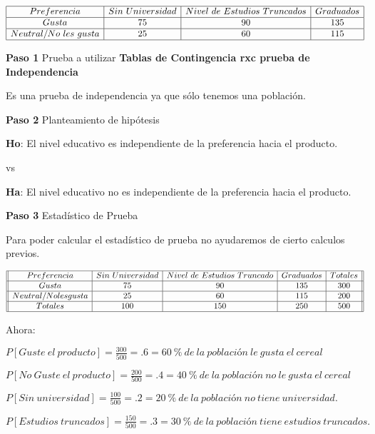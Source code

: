\documentclass[a4paper,oneside,openany]{book}
\begin{document}
\[
\begin{equation*}
\begin{array}{|c|c|c|c|} 
\hline
Preferencia& Sin\ Universidad&Nivel\ de\ Estudios\ Truncados&Graduados\\
\hline
Gusta& 75&90&135\\
\hline
Neutral/No\ les\ gusta& 25&60&115\\
\hline
\end {array}
\end{equation*}
\]

\textbf{Paso 1} Prueba a utilizar \textbf{Tablas de Contingencia rxc
prueba de Independencia}

Es una prueba de independencia ya que sólo tenemos una población.

\textbf{Paso 2} Planteamiento de hipótesis

\textbf{Ho}: El nivel educativo es independiente de la preferencia hacia
el producto.

vs

\textbf{Ha}: El nivel educativo no es independiente de la preferencia
hacia el producto.

\textbf{Paso 3} Estadístico de Prueba

Para poder calcular el estadístico de prueba no ayudaremos de cierto
calculos previos.

\[
\begin{equation*}
\begin{array}{||c| c| c |c |c||} 
\hline 
Preferencia&Sin\ Universidad& Nivel\ de\ Estudios\ Truncado&Graduados & Totales \\  
 \hline
Gusta&75&90&135&300\\
 \hline
Neutral/No les gusta&25&60&115&200\\
 \hline
Totales&100&150&250&500\\
 \hline
\end{array}
\end{equation*}
\]

Ahora:

\(P[Guste\ el\ producto]= \frac{300}{500}=.6= 60\ \%\ de\ la\ población\ le\ gusta\ el\ cereal\)

\(P[No\ Guste\ el\ producto]= \frac{200}{500}=.4= 40\ \%\ de\ la\ población\ no\ le\ gusta\ el\ cereal\)

\(P[Sin\ universidad]= \frac{100}{500}=.2= 20\ \%\ de\ la\ población\ no\ tiene\ universidad.\)

\(P[Estudios\ truncados]= \frac{150}{500}=.3= 30\ \%\ de\ la\ población\ tiene\ estudios\ truncados.\)
\end{document}
